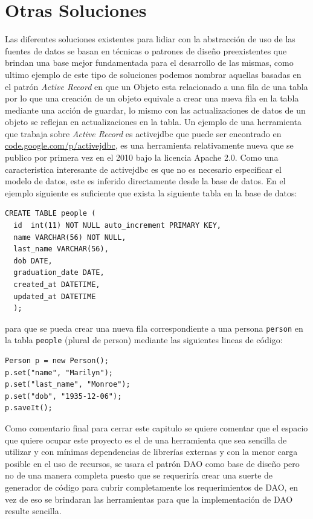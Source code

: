 \section{Otras Soluciones}
Las diferentes soluciones existentes para lidiar con la abstracción de uso de las fuentes de datos se basan en técnicas o patrones de diseño preexistentes que brindan una base mejor fundamentada para el desarrollo de las mismas, como ultimo ejemplo de este tipo de soluciones podemos nombrar aquellas basadas en el patrón \textit{Active Record} en que un Objeto esta relacionado a una fila de una tabla por lo que una creación de un objeto equivale a crear una nueva fila en la tabla mediante una acción de guardar, lo mismo con las actualizaciones de datos de un objeto se reflejan en actualizaciones en la tabla. Un ejemplo de una herramienta que trabaja sobre \textit{Active Record} es activejdbc que puede ser encontrado en \href{http://code.google.com/p/activejdbc/}{code.google.com/p/activejdbc}, es una herramienta relativamente nueva que se publico por primera vez en el 2010 bajo la licencia Apache 2.0. Como  una caracteristica interesante de activejdbc es que no es necesario especificar el modelo de datos, este es inferido directamente desde la base de datos. En el ejemplo siguiente es suficiente que exista la siguiente tabla en la base de datos:
%
\begin{lstlisting}[title=Ejemplo de uso de activejdbc: tabla que debe existir en la BD]
CREATE TABLE people (
  id  int(11) NOT NULL auto_increment PRIMARY KEY, 
  name VARCHAR(56) NOT NULL, 
  last_name VARCHAR(56), 
  dob DATE, 
  graduation_date DATE, 
  created_at DATETIME, 
  updated_at DATETIME
  );
\end{lstlisting}
%
para que se pueda crear una nueva fila correspondiente a una persona \verb=person= en la tabla \verb=people= (plural de person) mediante las siguientes lineas de código: 
\begin{lstlisting}[title=Ejemplo de uso de activejdbc: creando una nueva fila en una tabla]
Person p = new Person();
p.set("name", "Marilyn");
p.set("last_name", "Monroe");
p.set("dob", "1935-12-06");
p.saveIt(); 
\end{lstlisting}
%

Como comentario final para cerrar este capitulo se quiere comentar que el espacio que quiere ocupar este proyecto es el de una herramienta que sea sencilla de utilizar y con mínimas dependencias de librerías externas y con la menor carga posible en el uso de recursos, se usara el patrón DAO como base de diseño pero no de una manera completa puesto que se requeriría crear una suerte de generador de código para cubrir completamente los requerimientos de DAO, en vez de eso se brindaran las herramientas para que la implementación de DAO resulte sencilla.
